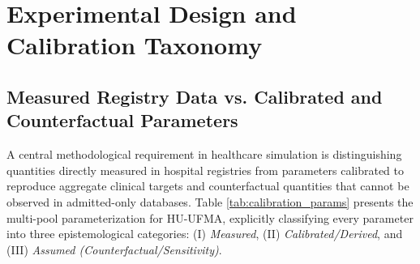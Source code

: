 \documentclass[final,5p,times,twocolumn]{elsarticle}
\begin{document}
\section{Experimental Design and Calibration Taxonomy}
\label{sec:experiments}

\subsection{Measured Registry Data vs. Calibrated and Counterfactual Parameters}

A central methodological requirement in healthcare simulation is distinguishing quantities directly measured in hospital registries from parameters calibrated to reproduce aggregate clinical targets and counterfactual quantities that cannot be observed in admitted-only databases. Table \ref{tab:calibration_params} presents the multi-pool parameterization for HU-UFMA, explicitly classifying every parameter into three epistemological categories: (I) \textit{Measured}, (II) \textit{Calibrated/Derived}, and (III) \textit{Assumed (Counterfactual/Sensitivity)}.
\end{document}
